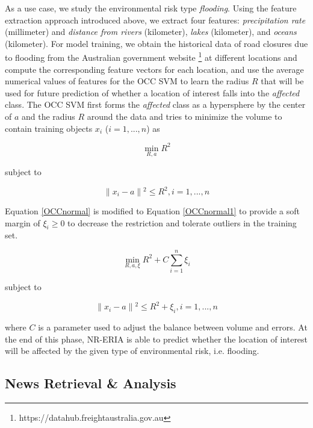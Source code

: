 \documentclass[
]{ceurart}
\begin{document}
As a use case, we study the environmental risk type \textit{flooding}. Using the feature extraction approach introduced above, we extract four features: \emph{precipitation rate} (millimeter) and \emph{distance from rivers} (kilometer), \emph{lakes} (kilometer), and \emph{oceans} (kilometer). 
For model training, we obtain the historical data of road closures due to flooding from the Australian government website \footnote{https://datahub.freightaustralia.gov.au} at different locations and compute the corresponding feature vectors for each location, and use the average numerical values of features for the OCC SVM to learn the radius $R$ that will be used for future prediction of whether a location of interest falls into the \textit{affected} class. 
The OCC SVM first forms the \emph{affected} class as a hypersphere by the center of $a$ and the radius $R$ around the data and tries to minimize the volume to contain training objects $x_i$ ($i=1,...,n$) as 

\begin{equation}\label{OCCnormal}
    \min_{R, a}R^2
\end{equation}

subject to

\begin{equation}\label{OCCconstraints}
    \parallel{x_i - a}\parallel{^2}\leq R^2, i=1,...,n
\end{equation}

Equation \ref{OCCnormal} is modified to Equation \ref{OCCnormal1} to provide a soft margin of $\xi_i\geq0$ to decrease the restriction and tolerate outliers in the training set.

\begin{equation}\label{OCCnormal1}
    \min_{R, a, \xi}R^2 + C\sum_{i=1}^n\xi_i
\end{equation}

subject to

\begin{equation}\label{OCCconstraints1}
    \parallel{x_i - a}\parallel{^2}\leq R^2 + \xi_i, i=1,...,n
\end{equation}

where $C$ is a parameter used to adjust the balance between volume and errors. At the end of this phase, NR-ERIA is able to predict whether the location of interest will be affected by the given type of environmental risk, i.e. flooding.

\subsection {News Retrieval \& Analysis} \label{sec:news_retrieval}
\end{document}

